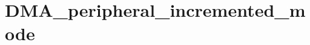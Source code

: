 \hypertarget{group___d_m_a__peripheral__incremented__mode}{\section{D\-M\-A\-\_\-peripheral\-\_\-incremented\-\_\-mode}
\label{group___d_m_a__peripheral__incremented__mode}
}
